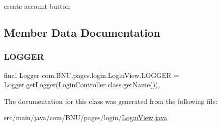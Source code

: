 create account button 

\subsection{Member Data Documentation}
\mbox{\label{classcom_1_1_b_n_u_1_1pages_1_1login_1_1_login_view_a2e31cefa39790a078ae4fe23ba4ae2cd}} 
\subsubsection{\texorpdfstring{L\+O\+G\+G\+ER}{LOGGER}}
{\footnotesize\ttfamily final Logger com.\+B\+N\+U.\+pages.\+login.\+Login\+View.\+L\+O\+G\+G\+ER = Logger.\+get\+Logger(Login\+Controller.\+class.\+get\+Name())\hspace{0.3cm}{\ttfamily [static]}, {\ttfamily [private]}}



The documentation for this class was generated from the following file\+:\begin{DoxyCompactItemize}
\item 
src/main/java/com/\+B\+N\+U/pages/login/\mbox{\hyperlink{_login_view_8java}{Login\+View.\+java}}\end{DoxyCompactItemize}
